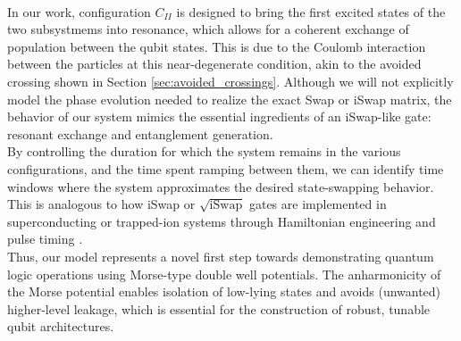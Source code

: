 \documentclass{subfiles}
\begin{document}
\\
In our work, configuration $C_{II}$ is designed to bring the first excited states of the two subsystmems into resonance, which allows for a coherent exchange of population between the qubit states. This is due to the Coulomb interaction between the particles at this near-degenerate condition, akin to the avoided crossing shown in Section \ref{sec:avoided_crossings}. Although we will not explicitly model the phase evolution needed to realize the exact Swap or iSwap matrix, the behavior of our system mimics the essential ingredients of an iSwap-like gate: resonant exchange and entanglement generation. \\
By controlling the duration for which the system remains in the various configurations, and the time spent ramping between them, we can identify time windows where the system approximates the desired state-swapping behavior. This is analogous to how iSwap or $\sqrt{\text{iSwap}}$ gates are implemented in superconducting or trapped-ion systems through Hamiltonian engineering and pulse timing \cite{picard2025entanglement}. \\

Thus, our model represents a novel first step towards demonstrating quantum logic operations using Morse-type double well potentials. The anharmonicity of the Morse potential enables isolation of low-lying states and avoids (unwanted) higher-level leakage, which is essential for the construction of robust, tunable qubit architectures\cite{nielsen2010quantum}.
\end{document}
